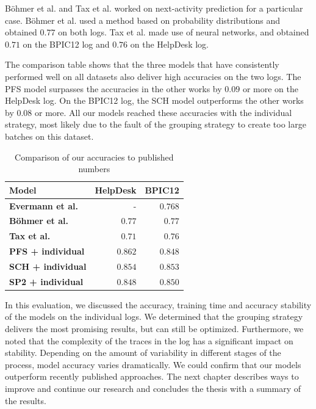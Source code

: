 Böhmer et al. and Tax et al. worked on next-activity prediction for a particular case.
Böhmer et al. used a method based on probability distributions and obtained $0.77$ on both logs.
Tax et al. made use of neural networks, and obtained $0.71$ on the BPIC12 log and $0.76$ on the HelpDesk log.

The comparison table shows that the three models that have consistently performed well on all datasets also deliver high accuracies on the two logs.
The PFS model surpasses the accuracies in the other works by $0.09$ or more on the HelpDesk log.
On the BPIC12 log, the SCH model outperforms the other works by $0.08$ or more.
All our models reached these accuracies with the individual strategy, most likely due to the fault of the grouping strategy to create too large batches on this dataset.\\

\begin{table}
\centering
\begin{tabular}{lrr}
\textbf{Model}  &  \textbf{HelpDesk} &  \textbf{BPIC12} \\
\midrule
\textbf{Evermann et al.~\cite{evermann2016}} & - & $0.768$\\
\textbf{Böhmer et al.~\cite{boehmer2018probability}  } & $0.77$ & $0.77$ \\
\textbf{Tax et al.~\cite{tax2017}} & $0.71$ & $0.76$\\
\hline
\textbf{PFS + individual} & $0.862$ & $0.848$ \\
\textbf{SCH + individual} & $0.854$ & $0.853$ \\
\textbf{SP2 + individual} & $0.848$ & $0.850$\\
\end{tabular}
\caption{Comparison of our accuracies to published numbers}
\label{tab:accuracy-comparison}
\end{table}

In this evaluation, we discussed the accuracy, training time and accuracy stability of the models on the individual logs.
We determined that the grouping strategy delivers the most promising results, but can still be optimized.
Furthermore, we noted that the complexity of the traces in the log has a significant impact on stability.
Depending on the amount of variability in different stages of the process, model accuracy varies dramatically.
We could confirm that our models outperform recently published approaches.
The next chapter describes ways to improve and continue our research and concludes the thesis with a summary of the results.
